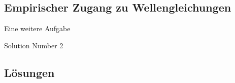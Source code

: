\documentclass[a4paper]{article}
\begin{document}
\subsection{Empirischer Zugang zu Wellengleichungen}

\begin{exercise}[difficulty=hard]
Eine weitere Aufgabe
\end{exercise}
\begin{solution}
Solution Number 2
\end{solution}

\subsection*{Lösungen}
\printsolutions[section]
\end{document}
